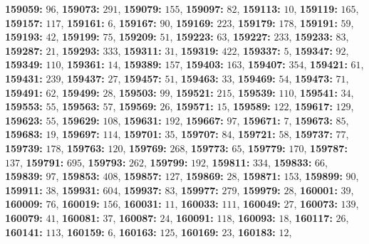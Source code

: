\textsf{\bfseries 159059:} $96$, \textsf{\bfseries 159073:} $291$, \textsf{\bfseries 159079:} $155$, \textsf{\bfseries 159097:} $82$, \textsf{\bfseries 159113:} $10$, \textsf{\bfseries 159119:} $165$, \textsf{\bfseries 159157:} $117$, \textsf{\bfseries 159161:} $6$, \textsf{\bfseries 159167:} $90$, \textsf{\bfseries 159169:} $223$, \textsf{\bfseries 159179:} $178$, \textsf{\bfseries 159191:} $59$, \textsf{\bfseries 159193:} $42$, \textsf{\bfseries 159199:} $75$, \textsf{\bfseries 159209:} $51$, \textsf{\bfseries 159223:} $63$, \textsf{\bfseries 159227:} $233$, \textsf{\bfseries 159233:} $83$, \textsf{\bfseries 159287:} $21$, \textsf{\bfseries 159293:} $333$, \textsf{\bfseries 159311:} $31$, \textsf{\bfseries 159319:} $422$, \textsf{\bfseries 159337:} $5$, \textsf{\bfseries 159347:} $92$, \textsf{\bfseries 159349:} $110$, \textsf{\bfseries 159361:} $14$, \textsf{\bfseries 159389:} $157$, \textsf{\bfseries 159403:} $163$, \textsf{\bfseries 159407:} $354$, \textsf{\bfseries 159421:} $61$, \textsf{\bfseries 159431:} $239$, \textsf{\bfseries 159437:} $27$, \textsf{\bfseries 159457:} $51$, \textsf{\bfseries 159463:} $33$, \textsf{\bfseries 159469:} $54$, \textsf{\bfseries 159473:} $71$, \textsf{\bfseries 159491:} $62$, \textsf{\bfseries 159499:} $28$, \textsf{\bfseries 159503:} $99$, \textsf{\bfseries 159521:} $215$, \textsf{\bfseries 159539:} $110$, \textsf{\bfseries 159541:} $34$, \textsf{\bfseries 159553:} $55$, \textsf{\bfseries 159563:} $57$, \textsf{\bfseries 159569:} $26$, \textsf{\bfseries 159571:} $15$, \textsf{\bfseries 159589:} $122$, \textsf{\bfseries 159617:} $129$, \textsf{\bfseries 159623:} $55$, \textsf{\bfseries 159629:} $108$, \textsf{\bfseries 159631:} $192$, \textsf{\bfseries 159667:} $97$, \textsf{\bfseries 159671:} $7$, \textsf{\bfseries 159673:} $85$, \textsf{\bfseries 159683:} $19$, \textsf{\bfseries 159697:} $114$, \textsf{\bfseries 159701:} $35$, \textsf{\bfseries 159707:} $84$, \textsf{\bfseries 159721:} $58$, \textsf{\bfseries 159737:} $77$, \textsf{\bfseries 159739:} $178$, \textsf{\bfseries 159763:} $120$, \textsf{\bfseries 159769:} $268$, \textsf{\bfseries 159773:} $65$, \textsf{\bfseries 159779:} $170$, \textsf{\bfseries 159787:} $137$, \textsf{\bfseries 159791:} $695$, \textsf{\bfseries 159793:} $262$, \textsf{\bfseries 159799:} $192$, \textsf{\bfseries 159811:} $334$, \textsf{\bfseries 159833:} $66$, \textsf{\bfseries 159839:} $97$, \textsf{\bfseries 159853:} $408$, \textsf{\bfseries 159857:} $127$, \textsf{\bfseries 159869:} $28$, \textsf{\bfseries 159871:} $153$, \textsf{\bfseries 159899:} $90$, \textsf{\bfseries 159911:} $38$, \textsf{\bfseries 159931:} $604$, \textsf{\bfseries 159937:} $83$, \textsf{\bfseries 159977:} $279$, \textsf{\bfseries 159979:} $28$, \textsf{\bfseries 160001:} $39$, \textsf{\bfseries 160009:} $76$, \textsf{\bfseries 160019:} $156$, \textsf{\bfseries 160031:} $11$, \textsf{\bfseries 160033:} $111$, \textsf{\bfseries 160049:} $27$, \textsf{\bfseries 160073:} $139$, \textsf{\bfseries 160079:} $41$, \textsf{\bfseries 160081:} $37$, \textsf{\bfseries 160087:} $24$, \textsf{\bfseries 160091:} $118$, \textsf{\bfseries 160093:} $18$, \textsf{\bfseries 160117:} $26$, \textsf{\bfseries 160141:} $113$, \textsf{\bfseries 160159:} $6$, \textsf{\bfseries 160163:} $125$, \textsf{\bfseries 160169:} $23$, \textsf{\bfseries 160183:} $12$, 

